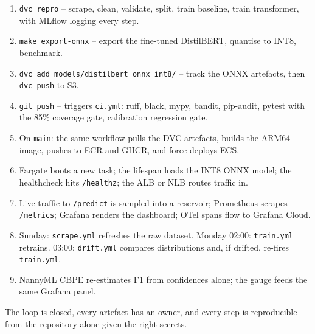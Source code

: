 \documentclass[11pt,a4paper]{article}
\begin{document}
\begin{enumerate}[leftmargin=*]
\item \texttt{dvc repro} -- scrape, clean, validate, split, train baseline, train
      transformer, with MLflow logging every step.
\item \texttt{make export-onnx} -- export the fine-tuned DistilBERT, quantise to
      INT8, benchmark.
\item \texttt{dvc add models/distilbert\_onnx\_int8/} -- track the ONNX artefacts,
      then \texttt{dvc push} to S3.
\item \texttt{git push} -- triggers \texttt{ci.yml}: ruff, black, mypy, bandit,
      pip-audit, pytest with the 85\% coverage gate, calibration regression gate.
\item On \texttt{main}: the same workflow pulls the DVC artefacts, builds the
      ARM64 image, pushes to ECR and GHCR, and force-deploys ECS.
\item Fargate boots a new task; the lifespan loads the INT8 ONNX model; the
      healthcheck hits \texttt{/healthz}; the ALB or NLB routes traffic in.
\item Live traffic to \texttt{/predict} is sampled into a reservoir; Prometheus
      scrapes \texttt{/metrics}; Grafana renders the dashboard; OTel spans flow
      to Grafana Cloud.
\item Sunday: \texttt{scrape.yml} refreshes the raw dataset. Monday 02:00:
      \texttt{train.yml} retrains. 03:00: \texttt{drift.yml} compares
      distributions and, if drifted, re-fires \texttt{train.yml}.
\item NannyML CBPE re-estimates F1 from confidences alone; the gauge feeds the
      same Grafana panel.
\end{enumerate}

The loop is closed, every artefact has an owner, and every step is reproducible
from the repository alone given the right secrets.
\end{document}
